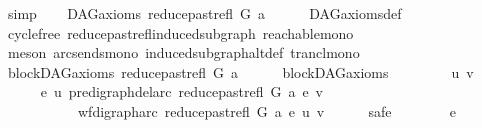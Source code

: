\begin{isabellebody}
\ simp\isanewline
{}\isamarkupfalse%
\isanewline
\ \ \isamarkupfalse%
\ {\isachardoublequoteopen}DAG{\isacharunderscore}{\kern0pt}axioms\ {\isacharparenleft}{\kern0pt}reduce{\isacharunderscore}{\kern0pt}past{\isacharunderscore}{\kern0pt}refl\ G\ a{\isacharparenright}{\kern0pt}{\isachardoublequoteclose}\isanewline
\ \ \ \ \isamarkupfalse%
\ DAG{\isacharunderscore}{\kern0pt}axioms{\isacharunderscore}{\kern0pt}def\isanewline
\ \ \ \ \isamarkupfalse%
\ cycle{\isacharunderscore}{\kern0pt}free\ reduce{\isacharunderscore}{\kern0pt}past{\isacharunderscore}{\kern0pt}refl{\isacharunderscore}{\kern0pt}induced{\isacharunderscore}{\kern0pt}subgraph\ reachable{\isacharunderscore}{\kern0pt}mono\isanewline
\ \ \ \ \isamarkupfalse%
\ {\isacharparenleft}{\kern0pt}meson\ arcs{\isacharunderscore}{\kern0pt}ends{\isacharunderscore}{\kern0pt}mono\ induced{\isacharunderscore}{\kern0pt}subgraph{\isacharunderscore}{\kern0pt}altdef\ trancl{\isacharunderscore}{\kern0pt}mono{\isacharparenright}{\kern0pt}\ \isanewline
{}\isamarkupfalse%
\isanewline
\ \ \isamarkupfalse%
\ {\isachardoublequoteopen}blockDAG{\isacharunderscore}{\kern0pt}axioms\ {\isacharparenleft}{\kern0pt}reduce{\isacharunderscore}{\kern0pt}past{\isacharunderscore}{\kern0pt}refl\ G\ a{\isacharparenright}{\kern0pt}{\isachardoublequoteclose}\isanewline
\ \ \ \ \isamarkupfalse%
\ blockDAG{\isacharunderscore}{\kern0pt}axioms\isanewline
\ \ \isamarkupfalse%
\isanewline
\ \ \ \ \isamarkupfalse%
\ u\ v\ \isanewline
\ \ \ \ \isamarkupfalse%
\ {\isachardoublequoteopen}{\isasymforall}e{\isachardot}{\kern0pt}\ u\ {\isasymrightarrow}\isactrlsup {\isacharplus}{\kern0pt}\isactrlbsub pre{\isacharunderscore}{\kern0pt}digraph{\isachardot}{\kern0pt}del{\isacharunderscore}{\kern0pt}arc\ {\isacharparenleft}{\kern0pt}reduce{\isacharunderscore}{\kern0pt}past{\isacharunderscore}{\kern0pt}refl\ G\ a{\isacharparenright}{\kern0pt}\ e\isactrlesub \ v\isanewline
\ \ \ \ \ \ \ \ \ {\isasymlongrightarrow}\ {\isasymnot}\ wf{\isacharunderscore}{\kern0pt}digraph{\isachardot}{\kern0pt}arc\ {\isacharparenleft}{\kern0pt}reduce{\isacharunderscore}{\kern0pt}past{\isacharunderscore}{\kern0pt}refl\ G\ a{\isacharparenright}{\kern0pt}\ e\ {\isacharparenleft}{\kern0pt}u{\isacharcomma}{\kern0pt}\ v{\isacharparenright}{\kern0pt}{\isachardoublequoteclose}\isanewline
\ \ \ \ \isamarkupfalse%
\ safe\isanewline
\ \ \ \ \ \ \isamarkupfalse%
\ e\ \isanewline

\end{isabellebody}
